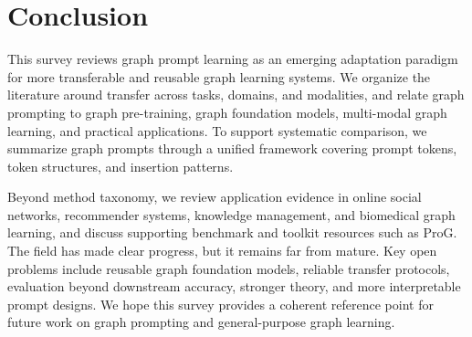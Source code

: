 \section{Conclusion}\label{sec:con}
This survey reviews graph prompt learning as an emerging adaptation paradigm for more transferable and reusable graph learning systems. We organize the literature around transfer across tasks, domains, and modalities, and relate graph prompting to graph pre-training, graph foundation models, multi-modal graph learning, and practical applications. To support systematic comparison, we summarize graph prompts through a unified framework covering prompt tokens, token structures, and insertion patterns.

Beyond method taxonomy, we review application evidence in online social networks, recommender systems, knowledge management, and biomedical graph learning, and discuss supporting benchmark and toolkit resources such as ProG. The field has made clear progress, but it remains far from mature. Key open problems include reusable graph foundation models, reliable transfer protocols, evaluation beyond downstream accuracy, stronger theory, and more interpretable prompt designs. We hope this survey provides a coherent reference point for future work on graph prompting and general-purpose graph learning.
